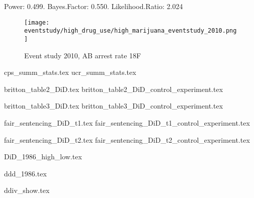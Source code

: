 \documentclass{article}
\begin{document}
Power: 0.499. Bayes.Factor: 0.550.  Likelihood.Ratio: 2.024

\clearpage

\begin{figure}[h]
  \caption{Event study 2010, AB arrest rate 18F}
  \centering
  \texttt{[image: eventstudy/high\_drug\_use/high\_marijuana\_eventstudy\_2010.png]}
  \label{fig:TBD}
\end{figure}

\clearpage




{cps_summ_stats.tex}
{ucr_summ_stats.tex}


{britton_table2_DiD.tex}
{britton_table2_DiD_control_experiment.tex}

{britton_table3_DiD.tex}
{britton_table3_DiD_control_experiment.tex}

{fair_sentencing_DiD_t1.tex}
{fair_sentencing_DiD_t1_control_experiment.tex}

{fair_sentencing_DiD_t2.tex}
{fair_sentencing_DiD_t2_control_experiment.tex}

{DiD_1986_high_low.tex}

{ddd_1986.tex}

{ddiv_show.tex}
\end{document}
